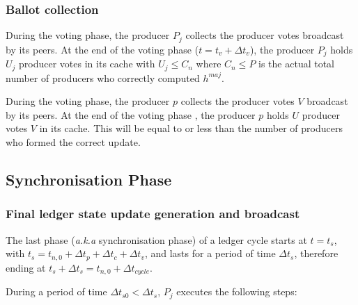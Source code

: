 \documentclass{article}
\begin{document}
\subsubsection{Ballot collection}
During the voting phase, the producer $P_j$ collects the producer votes broadcast by its peers. At the end of the voting phase ($t = t_v+\Delta t_{v}$), the producer $P_j$ holds $U_j$ producer votes in its cache with $U_j \leq C_n$ where $C_n \leq P$ is the actual total number of producers who correctly computed $h^{maj}$.

During the voting phase, the producer $p$ collects the producer votes $V$ broadcast by its peers. At the end of the voting phase , the producer $p$ holds $U$ producer votes $V$ in its cache. This will be equal to or less than the number of producers who formed the correct update. 

\subsection{Synchronisation Phase}

\subsubsection{Final ledger state update generation and broadcast}

The last phase (\textit{a.k.a} synchronisation phase) of a ledger cycle starts at $t = t_s$, with $t_s = t_{n,0} + \Delta t_{p} + \Delta t_{c}+ \Delta t_{v}$, and lasts for a period of time $\Delta t_{s}$, therefore ending at $t_s+\Delta t_s = t_{n,0} + \Delta t_{cycle}$.

During a period of time $\Delta t_{s0} < \Delta t_{s}$, $P_j$ executes the following steps:
\end{document}
